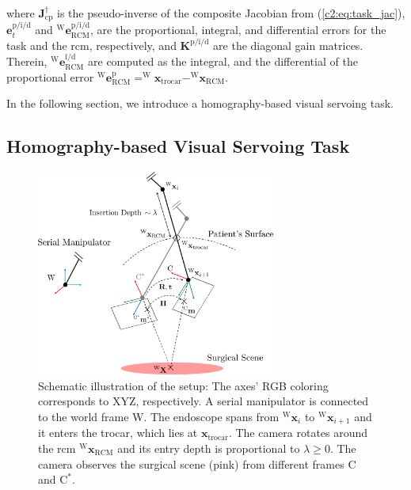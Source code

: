 where $\mathbf{J}_\text{cp}^{\dagger}$ is the pseudo-inverse of the composite Jacobian from (\eqref{c2:eq:task_jac}), $\mathbf{e}^{\text{p}/\text{i}/\text{d}}_t$ and $^\text{W}\mathbf{e}^{\text{p}/\text{i}/\text{d}}_\text{RCM}$, are the proportional, integral, and differential errors for the task and the \acrshort{rcm}, respectively, and $\mathbf{K}^{\text{p}/\text{i}/\text{d}}$ are the diagonal gain matrices. Therein, $^\text{W}\mathbf{e}_\text{RCM}^{\text{i}/\text{d}}$ are computed as the integral, and the differential of the proportional error $^\text{W}\mathbf{e}_\text{RCM}^\text{p} = ^\text{W}\mathbf{x}_\text{trocar} - ^\text{W}\mathbf{x}_\text{RCM}$. 

In the following section, we introduce a homography-based visual servoing task.

\subsection{Homography-based Visual Servoing Task}
\label{c2:sec:homography_task}

\begin{figure}[tb]
\centering
\includegraphics[width=0.7\textwidth]{img/h_rcm_vs_fig.pdf}
\caption{Schematic illustration of the setup: The axes' RGB coloring corresponds to XYZ, respectively. A serial manipulator is connected to the world frame W. The endoscope spans from $^\text{W}\mathbf{x}_i$ to $^\text{W}\mathbf{x}_{i+1}$ and it enters the trocar, which lies at $\mathbf{x}_\text{trocar}$. The camera rotates around the \acrshort{rcm} $^\text{W}\mathbf{x}_\text{RCM}$ and its entry depth is proportional to $\lambda \geq 0$.  The camera observes the surgical scene (pink) from different frames $\text{C}$ and $\text{C}^*$.}
\label{c2:fig:schematic}
\end{figure}

